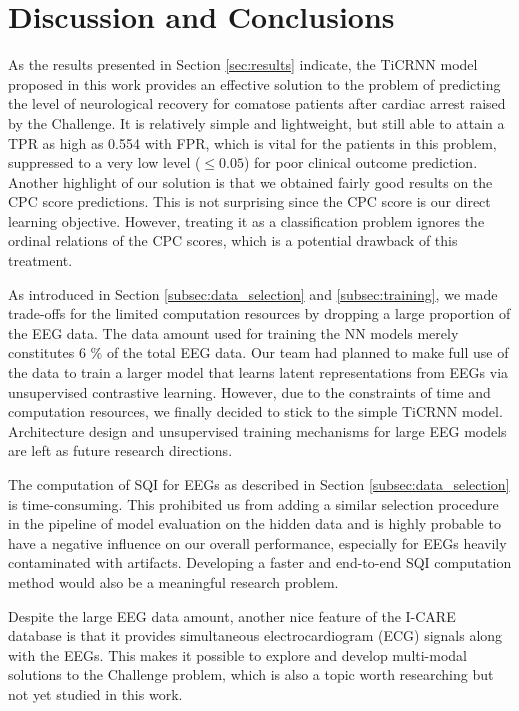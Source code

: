 \section{Discussion and Conclusions}
\label{sec:discu}


As the results presented in Section \ref{sec:results} indicate, the TiCRNN model proposed in this work provides an effective solution to the problem of predicting the level of neurological recovery for comatose patients after cardiac arrest raised by the Challenge. It is relatively simple and lightweight, but still able to attain a TPR as high as 0.554 with FPR, which is vital for the patients in this problem, suppressed to a very low level ($\le 0.05$) for poor clinical outcome prediction. Another highlight of our solution is that we obtained fairly good results on the CPC score predictions. This is not surprising since the CPC score is our direct learning objective. However, treating it as a classification problem ignores the ordinal relations of the CPC scores, which is a potential drawback of this treatment.

As introduced in Section \ref{subsec:data_selection} and \ref{subsec:training}, we made trade-offs for the limited computation resources by dropping a large proportion of the EEG data. The data amount used for training the NN models merely constitutes 6 \% of the total EEG data. Our team had planned to make full use of the data to train a larger model that learns latent representations from EEGs via unsupervised contrastive learning. However, due to the constraints of time and computation resources, we finally decided to stick to the simple TiCRNN model. Architecture design and unsupervised training mechanisms for large EEG models are left as future research directions.

The computation of SQI for EEGs as described in Section \ref{subsec:data_selection} is time-consuming. This prohibited us from adding a similar selection procedure in the pipeline of model evaluation on the hidden data and is highly probable to have a negative influence on our overall performance, especially for EEGs heavily contaminated with artifacts. Developing a faster and end-to-end SQI computation method would also be a meaningful research problem.

Despite the large EEG data amount, another nice feature of the I-CARE database is that it provides simultaneous electrocardiogram (ECG) signals along with the EEGs. This makes it possible to explore and develop multi-modal solutions to the Challenge problem, which is also a topic worth researching but not yet studied in this work.
